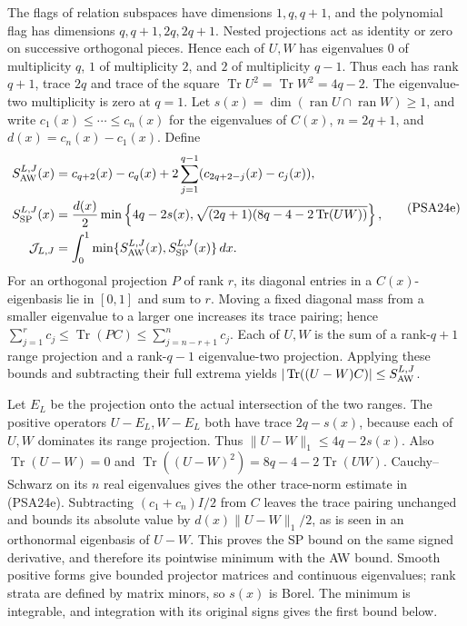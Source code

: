 The flags of relation subspaces have dimensions $1,q,q+1$, and
the polynomial flag has dimensions $q,q+1,2q,2q+1$.
Nested projections act as identity or zero on successive
orthogonal pieces. Hence each of $U,W$ has eigenvalues
$0$ of multiplicity $q$, $1$ of multiplicity $2$, and $2$
of multiplicity $q-1$. Thus each has rank $q+1$, trace $2q$
and trace of the square $\operatorname{Tr}U^2=\operatorname{Tr}W^2=4q-2$.
The eigenvalue-two multiplicity is zero at $q=1$.
Let $s(x)=\dim(\operatorname{ran}U\cap\operatorname{ran}W)\ge1$,
and write $c_1(x)\le\cdots\le c_n(x)$ for the eigenvalues of
$C(x)$, $n=2q+1$, and $d(x)=c_n(x)-c_1(x)$. Define
\[
 \begin{aligned}
 S_{\rm AW}^{L,J}(x)&=c_{q+2}(x)-c_q(x)
       +2\sum_{j=1}^{q-1}(c_{2q+2-j}(x)-c_j(x)),\\
 S_{\rm SP}^{L,J}(x)&=\frac{d(x)}2\min\left\{
      4q-2s(x),\sqrt{(2q+1)(8q-4-2\operatorname{Tr}(UW))}\right\},\\
 \mathcal J_{L,J}&=\int_0^1
            \min\{S_{\rm AW}^{L,J}(x),S_{\rm SP}^{L,J}(x)\}\,dx.
 \end{aligned}
 \tag{PSA24e}
\]
For an orthogonal projection $P$ of rank $r$, its diagonal entries
in a $C(x)$-eigenbasis lie in $[0,1]$ and sum to $r$.
Moving a fixed diagonal mass from a smaller eigenvalue to a larger
one increases its trace pairing; hence
$\sum_{j=1}^rc_j\le\operatorname{Tr}(PC)
\le\sum_{j=n-r+1}^nc_j$.
Each of $U,W$ is the sum of a rank-$q+1$ range projection and a
rank-$q-1$ eigenvalue-two projection. Applying these bounds and
subtracting their full extrema yields
$|\operatorname{Tr}((U-W)C)|\le S_{\rm AW}^{L,J}$.

Let $E_L$ be the projection onto the actual intersection of the
two ranges. The positive operators $U-E_L,W-E_L$ both have trace
$2q-s(x)$, because each of $U,W$ dominates its range projection.
Thus $\|U-W\|_1\le4q-2s(x)$. Also
$\operatorname{Tr}(U-W)=0$ and
$\operatorname{Tr}((U-W)^2)=8q-4-2\operatorname{Tr}(UW)$.
Cauchy--Schwarz on its $n$ real eigenvalues gives the other
trace-norm estimate in (PSA24e).
Subtracting $(c_1+c_n)I/2$ from $C$ leaves the trace pairing
unchanged and bounds its absolute value by $d(x)\|U-W\|_1/2$,
as is seen in an orthonormal eigenbasis of $U-W$.
This proves the SP bound on the same signed derivative, and
therefore its pointwise minimum with the AW bound.
Smooth positive forms give bounded projector matrices and
continuous eigenvalues; rank strata are defined by matrix minors,
so $s(x)$ is Borel. The minimum is integrable, and integration
with its original signs gives the first bound below.


